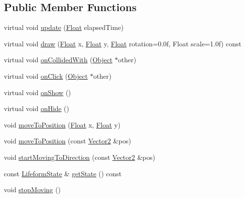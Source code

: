 \subsection*{Public Member Functions}
\begin{DoxyCompactItemize}
\item 
virtual void \hyperlink{classZeta_1_1Lifeform_a2c0d4d94f6254006bedf8a3b3713aeff}{update} (\hyperlink{namespaceZeta_a1e0a1265f9b3bd3075fb0fabd39088ba}{Float} elapsed\+Time)
\item 
virtual void \hyperlink{classZeta_1_1Lifeform_a12e6dabebc0844eb84a6cb60a226fb5f}{draw} (\hyperlink{namespaceZeta_a1e0a1265f9b3bd3075fb0fabd39088ba}{Float} x, \hyperlink{namespaceZeta_a1e0a1265f9b3bd3075fb0fabd39088ba}{Float} y, \hyperlink{namespaceZeta_a1e0a1265f9b3bd3075fb0fabd39088ba}{Float} rotation=0.\+0f, Float scale=1.\+0f) const 
\item 
virtual void \hyperlink{classZeta_1_1Lifeform_aeb704d42e63d0628e403411ef90e1a00}{on\+Collided\+With} (\hyperlink{classZeta_1_1Object}{Object} $\ast$other)
\item 
virtual void \hyperlink{classZeta_1_1Lifeform_af5af49463b71390564c298b3b2305ae9}{on\+Click} (\hyperlink{classZeta_1_1Object}{Object} $\ast$other)
\item 
virtual void \hyperlink{classZeta_1_1Lifeform_a7c5d94a47e9a824b910ff4776f973c9e}{on\+Show} ()
\item 
virtual void \hyperlink{classZeta_1_1Lifeform_af03a97a7d117b37f4922ab292c71f7d7}{on\+Hide} ()
\item 
void \hyperlink{classZeta_1_1Lifeform_afcbcb711849e683c3f0216255819ff13}{move\+To\+Position} (\hyperlink{namespaceZeta_a1e0a1265f9b3bd3075fb0fabd39088ba}{Float} x, \hyperlink{namespaceZeta_a1e0a1265f9b3bd3075fb0fabd39088ba}{Float} y)
\item 
void \hyperlink{classZeta_1_1Lifeform_a167c3aa9de300292d2c7fc9ab1201b4f}{move\+To\+Position} (const \hyperlink{classZeta_1_1Vector2}{Vector2} \&pos)
\item 
void \hyperlink{classZeta_1_1Lifeform_a82d0895250690a0efe41d99693300a10}{start\+Moving\+To\+Direction} (const \hyperlink{classZeta_1_1Vector2}{Vector2} \&pos)
\item 
const \hyperlink{classZeta_1_1LifeformState}{Lifeform\+State} \& \hyperlink{classZeta_1_1Lifeform_ae90a25c28c5e56ea7e6b76c040e30cd1}{get\+State} () const 
\item 
void \hyperlink{classZeta_1_1Lifeform_abea881d16d0c359e9b530b92dfe8375a}{stop\+Moving} ()
\item 

\end{DoxyCompactItemize}
